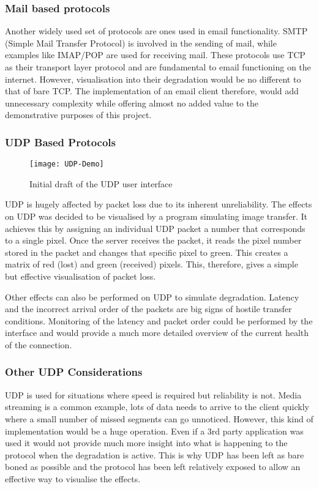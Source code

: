 \subsubsection*{Mail based protocols}
Another widely used set of protocols are ones used in email functionality. SMTP (Simple Mail Transfer Protocol) is involved in the sending of mail, while examples like IMAP/POP are used for receiving mail. These protocols use TCP as their transport layer protocol and are fundamental to email functioning on the internet. However, visualisation into their degradation would be no different to that of bare TCP. The implementation of an email client therefore, would add unnecessary complexity while offering almost no added value to the demonstrative purposes of this project.


\subsubsection{UDP Based Protocols}
\begin{wrapfigure}{R}{5cm}
\begin{center}
	\texttt{[image: UDP-Demo]}
	\caption{Initial draft of the UDP user interface}
\end{center}
\end{wrapfigure}

UDP is hugely affected by packet loss due to its inherent unreliability. The effects on UDP was decided to be visualised by a program simulating image transfer. It achieves this by assigning an individual UDP packet a number that corresponds to a single pixel. Once the server receives the packet, it reads the pixel number stored in the packet and changes that specific pixel to green. This creates a matrix of red (lost) and green (received) pixels. This, therefore, gives a simple but effective visualisation of packet loss. 

Other effects can also be performed on UDP to simulate degradation. Latency and the incorrect arrival order of the packets are big signs of hostile transfer conditions. Monitoring of the latency and packet order could be performed by the interface and would provide a much more detailed overview of the current health of the connection.

\subsubsection*{Other UDP Considerations}
\label{ref:otherUDP}
UDP is used for situations where speed is required but reliability is not. Media streaming is a common example, lots of data needs to arrive to the client quickly where a small number of missed segments can go unnoticed. However, this kind of implementation would be a huge operation. Even if a 3rd party application was used it would not provide much more insight into what is happening to the protocol when the degradation is active. This is why UDP has been left as bare boned as possible and the protocol has been left relatively exposed to allow an effective way to visualise the effects.

